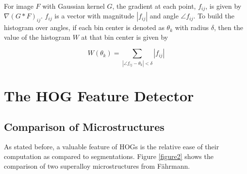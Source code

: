 \documentclass[review]{elsarticle}
\begin{document}
		For image $F$ with Gaussian kernel $G$, the gradient at each point, $f_{ij}$, is given by $\nabla \left( G \ast F \right)_{ij}$. $f_{ij}$ is a vector with magnitude $\left| f_{ij} \right|$ and angle $\angle f_{ij}$. To build the histogram over angles, if each bin center is denoted as $\theta_k$ with radius $\delta$, then the value of the histogram $W$ at that bin center is given by

		\begin{equation}
			W \left( \theta_k \right) = \sum_{\left| \angle f_{ij} - \theta_k \right| < \delta} \left| f_{ij} \right|
		\end{equation}

	\section{The HOG Feature Detector}\label{hog}
	\subsection{Comparison of Microstructures}
	As stated before, a valuable feature of HOGs is the relative ease of their computation as compared to segmentations. Figure \ref{figure2} shows the comparison of two superalloy microstructures from F\"ahrmann\cite{faehrmann}.
\end{document}
